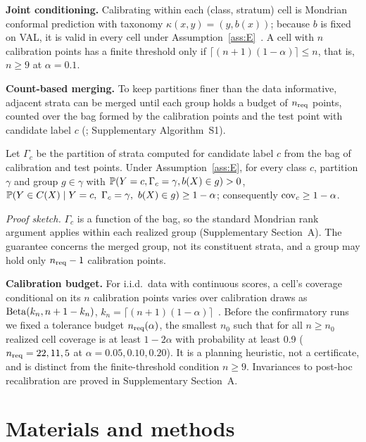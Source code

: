 \documentclass[10pt]{article}
\begin{document}
\textbf{Joint conditioning.} Calibrating within each (class, stratum) cell is Mondrian conformal prediction with taxonomy $\kappa(x,y)=(y,b(x))$; because $b$ is fixed on VAL, it is valid in every cell under Assumption~\ref{ass:E}~\cite{vovk2005alrw}. A cell with $n$ calibration points has a finite threshold only if $\lceil(n+1)(1-\alpha)\rceil\le n$, that is, $n\ge9$ at $\alpha=0.1$.

\textbf{Count-based merging.} To keep partitions finer than the data informative, adjacent strata can be merged until each group holds a budget of $n_{\mathrm{req}}$ points, counted over the bag formed by the calibration points and the test point with candidate label $c$ (\SABM; Supplementary Algorithm~S1).
\begin{theorem}\label{thm:sabm}
Let $\Gamma_c$ be the partition of strata computed for candidate label $c$ from the bag of calibration and test points. Under Assumption~\ref{ass:E}, for every class $c$, partition $\gamma$ and group $g\in\gamma$ with $\mathbb{P}(Y=c,\Gamma_c=\gamma,b(X)\in g)>0$, $\Prob(Y\in C(X)\mid Y=c,\ \Gamma_c=\gamma,\ b(X)\in g)\ge1-\alpha$; consequently $\mathrm{cov}_c\ge1-\alpha$.
\end{theorem}
\noindent\emph{Proof sketch.} $\Gamma_c$ is a function of the bag, so the standard Mondrian rank argument applies within each realized group (Supplementary Section~A). The guarantee concerns the merged group, not its constituent strata, and a group may hold only $n_{\mathrm{req}}-1$ calibration points.

\textbf{Calibration budget.} For i.i.d.\ data with continuous scores, a cell's coverage conditional on its $n$ calibration points varies over calibration draws as $\mathrm{Beta}(k_n,n+1-k_n)$, $k_n=\lceil(n+1)(1-\alpha)\rceil$~\cite{vovk2012conditional}. Before the confirmatory runs we fixed a tolerance budget $n_{\mathrm{req}}(\alpha)$, the smallest $n_0$ such that for all $n\ge n_0$ realized cell coverage is at least $1-2\alpha$ with probability at least 0.9 ($n_{\mathrm{req}}=22,11,5$ at $\alpha=0.05,0.10,0.20$). It is a planning heuristic, not a certificate, and is distinct from the finite-threshold condition $n\ge9$. Invariances to post-hoc recalibration are proved in Supplementary Section~A.

\section{Materials and methods}\label{sec:methods}
\end{document}
